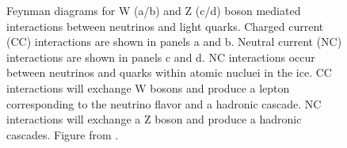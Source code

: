 \begin{figure}
    \caption{Feynman diagrams for W (a/b) and Z (c/d) boson mediated interactions between neutrinos and light quarks. Charged current (CC) interactions are shown in panels a and b. Neutral current (NC) interactions are shown in panels c and d. NC interactions occur between neutrinos and quarks within atomic nucluei in the ice. CC interactions will exchange W bosons and produce a lepton corresponding to the neutrino flavor and a hadronic cascade. NC interactions will exchange a Z boson and produce a hadronic cascades. Figure from \cite{physics_withIC3}.}
    \label{fig:ic2_ccORnc}
\end{figure}


